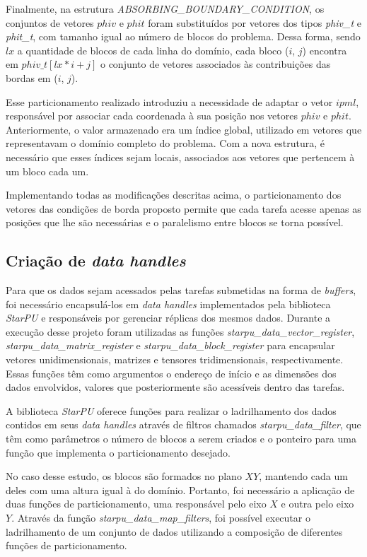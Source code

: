 \documentclass[cic,tc]{iiufrgs}
\begin{document}
Finalmente, na estrutura \textit{ABSORBING\_BOUNDARY\_CONDITION}, os conjuntos de vetores $phiv$ e $phit$ foram substituídos por vetores
dos tipos \textit{phiv\_t} e \textit{phit\_t}, com tamanho igual ao número de blocos do problema. Dessa forma, sendo $lx$ a quantidade
de blocos de cada linha do domínio, cada bloco ($i$, $j$) encontra em $phiv\_t[lx * i + j]$ o conjunto de vetores associados
às contribuições das bordas em ($i$, $j$).

Esse particionamento realizado introduziu a necessidade de adaptar o vetor $ipml$, responsável por associar cada coordenada à sua posição
nos vetores $phiv$ e $phit$. Anteriormente, o valor armazenado era um índice global, utilizado em vetores que representavam o domínio
completo do problema. Com a nova estrutura, é necessário que esses índices sejam locais, associados aos vetores que pertencem à um bloco
cada um.

Implementando todas as modificações descritas acima, o particionamento dos vetores das condições de borda proposto permite que cada
tarefa acesse apenas as posições que lhe são necessárias e o paralelismo entre blocos se torna possível.

\subsection{Criação de \textit{data handles}}

Para que os dados sejam acessados pelas tarefas submetidas na forma de \textit{buffers}, foi necessário encapsulá-los em
\textit{data handles} implementados pela biblioteca \textit{StarPU} e responsáveis por gerenciar réplicas dos mesmos dados.
Durante a execução desse projeto foram utilizadas as funções \textit{starpu\_data\_vector\_register},
\textit{starpu\_data\_matrix\_register} e \textit{starpu\_data\_block\_register} para encapsular vetores unidimensionais,
matrizes e tensores tridimensionais, respectivamente. Essas funções têm como argumentos o endereço de início e as dimensões dos
dados envolvidos, valores que posteriormente são acessíveis dentro das tarefas.

A biblioteca \textit{StarPU} oferece funções para realizar o ladrilhamento dos dados contidos em seus \textit{data handles} através
de filtros chamados \textit{starpu\_data\_filter}, que têm como parâmetros o número de blocos a serem criados e o ponteiro para uma
função que implementa o particionamento desejado.

No caso desse estudo, os blocos são formados no plano $XY$, mantendo cada um deles com uma altura igual à do domínio. Portanto, foi
necessário a aplicação de duas funções de particionamento, uma responsável pelo eixo $X$ e outra pelo eixo $Y$. Através da função
\textit{starpu\_data\_map\_filters}, foi possível executar o ladrilhamento de um conjunto de dados utilizando a composição de
diferentes funções de particionamento.
\end{document}
